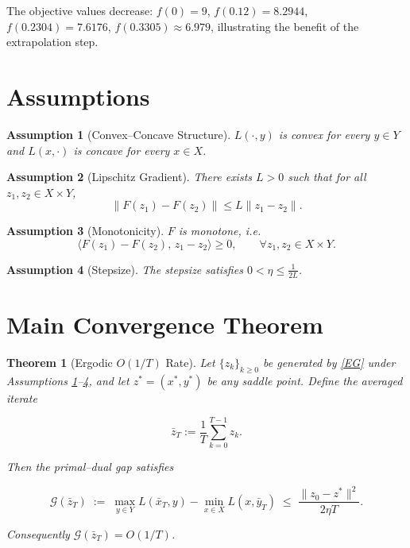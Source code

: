 \documentclass{article}
\newtheorem{theorem}{Theorem}
\newtheorem{assumption}{Assumption}
\newcommand{\gap}{\mathcal{G}}
\begin{document}
The objective values decrease: $f(0)=9$, $f(0.12)=8.2944$, $f(0.2304)=7.6176$, $f(0.3305)\approx6.979$,
illustrating the benefit of the extrapolation step.

\section*{Assumptions}
\begin{assumption}[Convex–Concave Structure]\label{as:cc}
$L(\cdot ,y)$ is convex for every $y\in Y$ and $L(x,\cdot )$ is concave for every $x\in X$.
\end{assumption}
\begin{assumption}[Lipschitz Gradient]\label{as:lips}
There exists $L>0$ such that for all $z_{1},z_{2}\in X\times Y$,
\[
\|F(z_{1})-F(z_{2})\|\le L\|z_{1}-z_{2}\|.
\]
\end{assumption}
\begin{assumption}[Monotonicity]\label{as:mono}
$F$ is monotone, i.e.
\[
\langle F(z_{1})-F(z_{2}),\,z_{1}-z_{2}\rangle\ge0,\qquad\forall z_{1},z_{2}\in X\times Y.
\]
\end{assumption}
\begin{assumption}[Stepsize]\label{as:step}
The stepsize satisfies $0<\eta\le \frac{1}{2L}$.
\end{assumption}

\section*{Main Convergence Theorem}
\begin{theorem}[Ergodic $O(1/T)$ Rate]\label{thm:rate}
Let $\{z_{k}\}_{k\ge0}$ be generated by \eqref{EG} under Assumptions \ref{as:cc}–\ref{as:step},
and let $z^{*}=(x^{*},y^{*})$ be any saddle point.  
Define the averaged iterate  

\[
\bar z_{T}:=\frac1T\sum_{k=0}^{T-1}z_{k}.
\]

Then the primal–dual gap satisfies  

\[
\gap(\bar z_{T})\;:=\;\max_{y\in Y}L(\bar x_{T},y)-\min_{x\in X}L(x,\bar y_{T})
\;\le\;\frac{\|z_{0}-z^{*}\|^{2}}{2\eta T}.
\tag{2}
\]

Consequently $\gap(\bar z_{T})=O(1/T)$.
\end{theorem}
\end{document}

